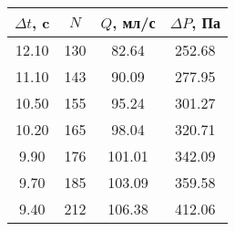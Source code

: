 \begin{tabular}{c|c|c|c}
\toprule
$\Delta t$, c & $N$ & $Q$, мл/с & $\Delta P$, Па \\
\midrule
12.10 & 130 & 82.64 & 252.68 \\
11.10 & 143 & 90.09 & 277.95 \\
10.50 & 155 & 95.24 & 301.27 \\
10.20 & 165 & 98.04 & 320.71 \\
9.90 & 176 & 101.01 & 342.09 \\
9.70 & 185 & 103.09 & 359.58 \\
9.40 & 212 & 106.38 & 412.06 \\
\bottomrule
\end{tabular}
